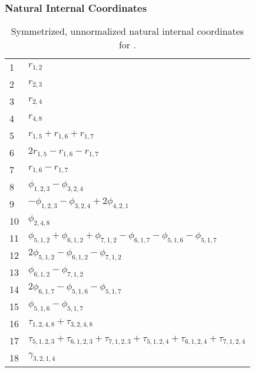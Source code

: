 \documentclass[10pt,oneside]{article}
\begin{document}
\clearpage

\subsubsection*{Natural Internal Coordinates}
\begin{table}[h!]
\centering
\caption{Symmetrized, unnormalized natural internal coordinates for .}
\small
\begin{tabular}{ll}
  1   & $r_{1,2}$ \\
  2   & $r_{2,3}$ \\
  3   & $r_{2,4}$ \\
  4   & $r_{4,8}$ \\
  5   & $r_{1,5} + r_{1,6} + r_{1,7}$ \\
  6   & $2r_{1,5} - r_{1,6} - r_{1,7}$ \\
  7   & $r_{1,6} - r_{1,7}$ \\
  8   & $\phi_{1,2,3} - \phi_{3,2,4}$ \\
  9   & $-\phi_{1,2,3} - \phi_{3,2,4} + 2\phi_{4,2,1}$ \\
  10  & $\phi_{2,4,8}$ \\
  11  & $\phi_{5,1,2} + \phi_{6,1,2} + \phi_{7,1,2} - \phi_{6,1,7} - \phi_{5,1,6} - \phi_{5,1,7}$ \\
  12  & $2\phi_{5,1,2} - \phi_{6,1,2} - \phi_{7,1,2}$ \\
  13  & $\phi_{6,1,2} - \phi_{7,1,2}$ \\
  14  & $2\phi_{6,1,7} - \phi_{5,1,6} - \phi_{5,1,7}$ \\
  15  & $\phi_{5,1,6} - \phi_{5,1,7}$ \\
  16  & $\tau_{1,2,4,8} + \tau_{3,2,4,8}$ \\
  17  & $\tau_{5,1,2,3} + \tau_{6,1,2,3} + \tau_{7,1,2,3} + \tau_{5,1,2,4} + \tau_{6,1,2,4} + \tau_{7,1,2,4}$ \\
  18  & $\gamma_{3,2,1,4}$ \\
\end{tabular}
\end{table}

\clearpage

\subsection{\ \ \ }
\end{document}
